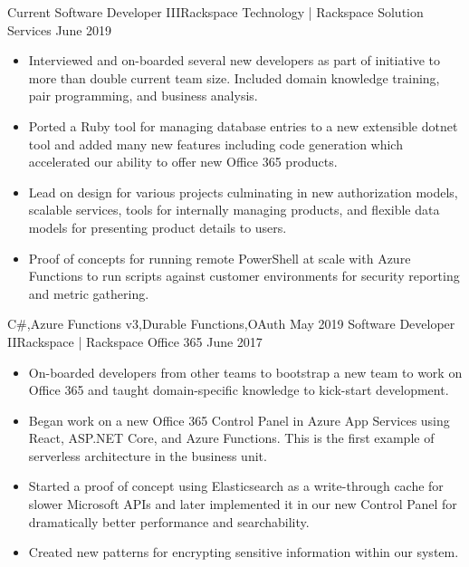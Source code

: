 \begin{experiences}
  \experience
    {Current}       {Software Developer III}{Rackspace Technology | Rackspace Solution Services}
    {June 2019}     {
                      \begin{itemize}
                        \item Interviewed and on-boarded several new developers as part of initiative to more than double current team size. Included domain knowledge training, pair programming, and business analysis.
                        \item Ported a Ruby tool for managing database entries to a new extensible dotnet tool and added many new features including code generation which accelerated our ability to offer new Office 365 products.
                        \item Lead on design for various projects culminating in new authorization models, scalable services, tools for internally managing products, and flexible data models for presenting product details to users.
                        \item Proof of concepts for running remote PowerShell at scale with Azure Functions to run scripts against customer environments for security reporting and metric gathering.
                      \end{itemize}
                    }
                    {C\#,Azure Functions v3,Durable Functions,OAuth}
  \emptySeparator
  \experience
    {May 2019}     {Software Developer II}{Rackspace | Rackspace Office 365}
    {June 2017}    {
                      \begin{itemize}
                        \item On-boarded developers from other teams to bootstrap a new team to work on Office 365 and taught domain-specific knowledge to kick-start development.
                        \item Began work on a new Office 365 Control Panel in Azure App Services using React, ASP.NET Core, and Azure Functions. This is the first example of serverless architecture in the business unit.
                        \item Started a proof of concept using Elasticsearch as a write-through cache for slower Microsoft APIs and later implemented it in our new Control Panel for dramatically better performance and searchability.
                        \item Created new patterns for encrypting sensitive information within our system.

\end{itemize}}
\end{experiences}
